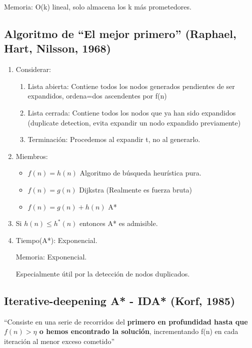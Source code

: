 \documentclass[12pt, twoside, openright]{report} %
\begin{document}
	Memoria: O(k) lineal, solo almacena los k más prometedores.
\pagebreak
	
\subsection{Algoritmo de ``El mejor primero'' (Raphael, Hart, Nilsson, 1968)}
  

  \begin{enumerate}
  \item
    Considerar:

    \begin{enumerate}
  
    \item
      Lista abierta: Contiene todos los nodos generados pendientes de
      ser expandidos, ordena=dos ascendentes por f(n)
    \item
      Lista cerrada: Contiene todos los nodos que ya han sido expandidos
      (duplicate detection, evita expandir un nodo expandido
      previamente)
    \item
      Terminación: Procedemos al expandir t, no al generarlo.
    \end{enumerate}
  \item
    Miembros:
    \begin{itemize}
  
    \item
      \(f(n)=h(n)\) Algoritmo de búsqueda heurística pura.
    \item
      \(f(n)=g(n)\) Dijkstra (Realmente es fuerza bruta)
    \item
      \(f(n) = g(n) + h(n)\) A*
    \end{itemize}
  \item
    Si \(h(n) \leq h^*(n)\) entonces A* es admisible.
  \item
    Tiempo(A*): Exponencial.

    Memoria: Exponencial.

    Especialmente útil por la detección de nodos duplicados.

  \end{enumerate}

\subsection{Iterative-deepening A* - IDA* (Korf, 1985)}

  ``Consiste en una serie de recorridos del \textbf{primero en
  profundidad hasta que \(f(n) > \eta\) o hemos encontrado la solución},
  incrementando f(n) en cada iteración al menor exceso cometido''
\end{document}
